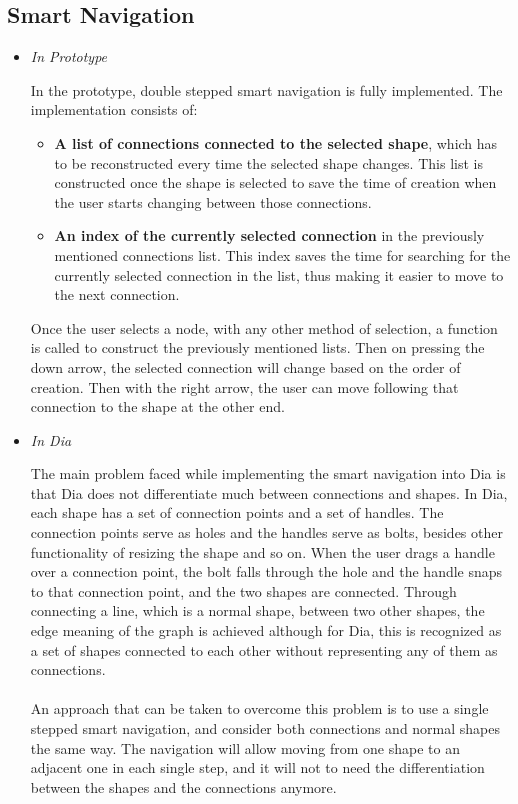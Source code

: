 \subsection{Smart Navigation}
\begin{itemize}
\item {\it In Prototype}
\par \noindent
In the prototype, double stepped smart navigation is fully implemented. 
The implementation consists of:
\begin{itemize}
\item {\bf A list of connections connected to the selected shape}, which has to be reconstructed every time the selected shape changes. This list is constructed once the shape is selected to save the time of creation when the user starts changing between those connections.
\item {\bf An index of the currently selected connection} in the previously mentioned connections list. This index saves the time for searching for the currently selected connection in the list, thus making it easier to move to the next connection.
\end{itemize}
Once the user selects a node, with any other method of selection, a function is called to construct the previously mentioned lists. Then on pressing the down arrow, the selected connection will change based on the order of creation. Then with the right arrow, the user can move following that connection to the shape at the other end.


\item {\it In Dia}
\par \noindent
The main problem faced while implementing the smart navigation into Dia is that Dia does not differentiate much between connections and shapes. In Dia, each shape has a set of connection points and a set of handles. The connection points serve as holes and the handles serve as bolts, besides other functionality of resizing the shape and so on. When the user drags a handle over a connection point, the bolt falls through the hole and the handle snaps to that connection point, and the two shapes are connected. Through connecting a line, which is a normal shape, between two other shapes, the edge meaning of the graph is achieved although for Dia, this is recognized as a set of shapes connected to each other without representing any of them as connections.

\paragraph{}
An approach that can be taken to overcome this problem is to use a single stepped smart navigation, and consider both connections and normal shapes the same way. The navigation will allow moving from one shape to an adjacent one in each single step, and it will not to need the differentiation between the shapes and the connections anymore.


\end{itemize}

